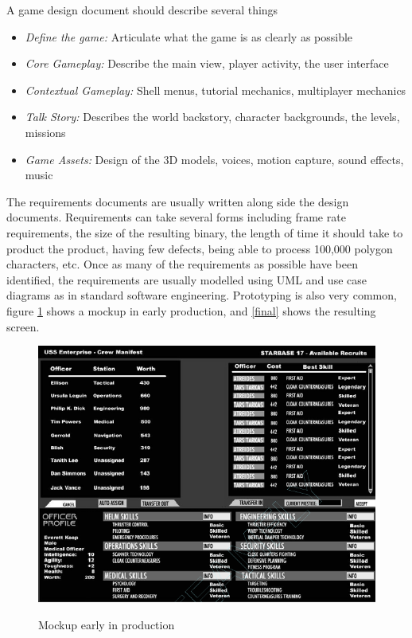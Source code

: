 A game design document should describe several things\cite{bethke2003game}
\begin{itemize}
	\item \emph{Define the game:} Articulate what the game is as clearly as possible
	\item \emph{Core Gameplay:} Describe the main view, player activity, the user interface
	\item \emph{Contextual Gameplay:} Shell menus, tutorial mechanics, multiplayer mechanics
	\item \emph{Talk Story:} Describes the world backstory, character backgrounds, the levels, missions
	\item \emph{Game Assets:} Design of the 3D models, voices, motion capture, sound effects, music
\end{itemize}

The requirements documents are usually written along side the design documents. Requirements can take several forms including\cite{bethke2003game} frame rate requirements, the size of the resulting binary, the length of time it should take to product the product, having few defects, being able to process 100,000 polygon characters, etc. Once as many of the requirements as possible have been identified, the requirements are usually modelled using UML and use case diagrams as in standard software engineering. Prototyping is also very common, figure \ref{mockup} shows a mockup in early production, and \ref{final} shows the resulting screen. 

\begin{figure}[!ht]
	\includegraphics[scale=0.5]{Images/mockup}
	\label{mockup}
	\caption{Mockup early in production \cite{bethke2003game}}
\end{figure}

